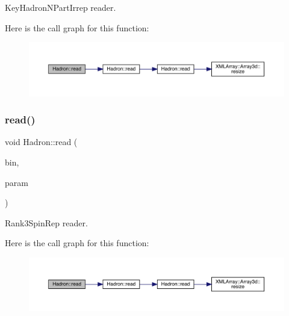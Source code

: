 Key\+Hadron\+N\+Part\+Irrep reader. 

Here is the call graph for this function\+:
\nopagebreak
\begin{figure}[H]
\begin{center}
\leavevmode
\includegraphics[width=350pt]{d1/daf/namespaceHadron_a205a666e574892fd5fc22e723a24399e_cgraph}
\end{center}
\end{figure}
\mbox{\label{namespaceHadron_aa7d26a465958f014ffb6f4cb4d45a389}} 
\subsubsection{\texorpdfstring{read()}{read()}\hspace{0.1cm}{\footnotesize\ttfamily [85/94]}}
{\footnotesize\ttfamily void Hadron\+::read (\begin{DoxyParamCaption}\item[{\mbox{\hyperlink{classADATIO_1_1BinaryReader}{Binary\+Reader}} \&}]{bin,  }\item[{\mbox{\hyperlink{structHadron_1_1Rank3SpinRep__t}{Rank3\+Spin\+Rep\+\_\+t}} \&}]{param }\end{DoxyParamCaption})}



Rank3\+Spin\+Rep reader. 

Here is the call graph for this function\+:
\nopagebreak
\begin{figure}[H]
\begin{center}
\leavevmode
\includegraphics[width=350pt]{d1/daf/namespaceHadron_aa7d26a465958f014ffb6f4cb4d45a389_cgraph}
\end{center}
\end{figure}
\mbox{\label{namespaceHadron_a0b9e3ade4af9d7765000d9cd6477956e}} 
